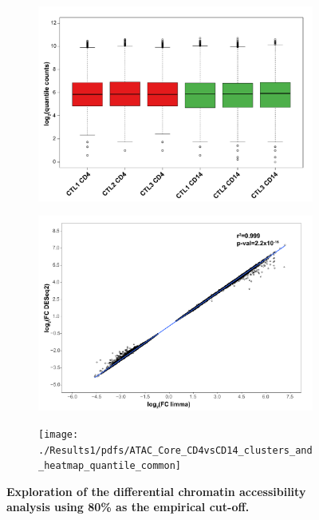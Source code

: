 \begin{figure}[htbp]
\centering
\begin{subfigure}{0.48\textwidth}
\centering
\includegraphics[width=\textwidth]{./Results1/pdfs/ATAC_Core_CD4_CD14_boxplot_80pcnt_cut_off_filtered_quantile_counts}
\caption{\textbf{}}
\end{subfigure}%
\begin{subfigure}{0.48\textwidth}
\centering
\includegraphics[width=\textwidth]{./Results1/pdfs/ATAC_Core_fastq_CD4_CD14_80pcnt_cut_off_correlation_log2FC_quantile_vs_deseq2}
\caption{\textbf{}}
\end{subfigure}
\begin{subfigure}{0.65\textwidth}
\centering
\texttt{[image: ./Results1/pdfs/ATAC\_Core\_CD4vsCD14\_clusters\_and\_heatmap\_quantile\_common]}
\caption{\textbf{}} %
\end{subfigure}
\caption[Exploration of the differential chromatin accessibility analysis using 80\% as the empirical cut-off.]{\textbf{Exploration of the differential chromatin accessibility analysis using 80\% as the empirical cut-off.}}
\label{fig:QC_quantile_DOC_and_DESeq2_comparison}
\end{figure} 


